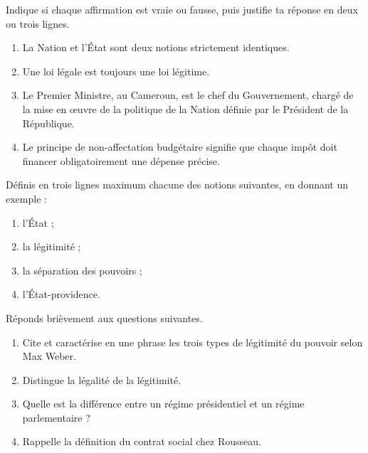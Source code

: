 \documentclass[11pt]{article}
\newcommand{\cle}[1]{{\popxbold\color{popdark}#1}}
\newcounter{popsec}
\newcounter{popsub}
\newcommand{\courssub}[1]{%
  \stepcounter{popsub}%
  \par\vspace{9pt}\noindent{\popxbold\fontsize{11.5}{13}\selectfont\color{popink}{\color{poporange}\thepopsec.\thepopsub}\hspace{6pt}#1}\par\nopagebreak\vspace{4pt}
}
\begin{document}
\begin{exercice}
Indique si chaque affirmation est vraie ou fausse, puis justifie ta réponse en deux ou trois lignes.
\begin{enumerate}
\item La Nation et l'État sont deux notions strictement identiques.
\item Une loi légale est toujours une loi légitime.
\item Le Premier Ministre, au Cameroun, est le chef du Gouvernement, chargé de la mise en œuvre de la politique de la Nation définie par le Président de la République.
\item Le principe de non-affectation budgétaire signifie que chaque impôt doit financer obligatoirement une dépense précise.
\end{enumerate}
\end{exercice}

\begin{exercice}[Définitions]
Définis en trois lignes maximum chacune des notions suivantes, en donnant un exemple :
\begin{enumerate}
\item l'État ;
\item la légitimité ;
\item la séparation des pouvoirs ;
\item l'État-providence.
\end{enumerate}
\end{exercice}

\begin{exercice}
Réponds brièvement aux questions suivantes.
\begin{enumerate}
\item Cite et caractérise en une phrase les trois types de légitimité du pouvoir selon Max Weber.
\item Distingue la \cle{légalité} de la \cle{légitimité}.
\item Quelle est la différence entre un régime présidentiel et un régime parlementaire ?
\item Rappelle la définition du contrat social chez Rousseau.
\end{enumerate}
\end{exercice}

\courssub{Je m'entraîne}
\end{document}
